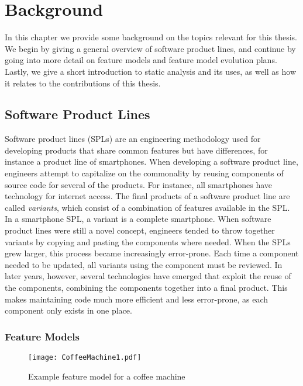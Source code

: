 \chapter{Background} 
\label{cha:background}

In this chapter we provide some background on the topics relevant for this thesis. We begin by giving a general overview of software product lines, and continue by going into more detail on feature models and feature model evolution plans. Lastly, we give a short introduction to static analysis and its uses, as well as how it relates to the contributions of this thesis.

\section{Software Product Lines}
\label{sec:software-product-lines}

Software product lines (SPLs) are an engineering methodology used for developing products that share common features but have differences, for instance a product line of smartphones. When developing a software product line, engineers attempt to capitalize on the commonality by reusing components of source code for several of the products. For instance, all smartphones have technology for internet access. The final products of a software product line are called \emph{variants}, which consist of a combination of features available in the SPL. In a smartphone SPL, a variant is a complete smartphone. When software product lines were still a novel concept, engineers tended to throw together variants by copying and pasting the components where needed. When the SPLs grew larger, this process became increasingly error-prone. Each time a component needed to be updated, all variants using the component must be reviewed. In later years, however, several technologies have emerged that exploit the reuse of the components, combining the components together into a final product. This makes maintaining code  much more efficient and less error-prone, as each component only exists in one place.~\cite{book:introduction-to-spl}


\subsection{Feature Models}
\label{sub:feature-models}

\begin{figure}
   \begin{center}
      \texttt{[image: CoffeeMachine1.pdf]}
   \end{center}
   \caption[Example feature model for a coffee machine]{Example feature model for a coffee machine \protect\footnotemark}
   \label{ex:fm-coffee1}
\end{figure}

